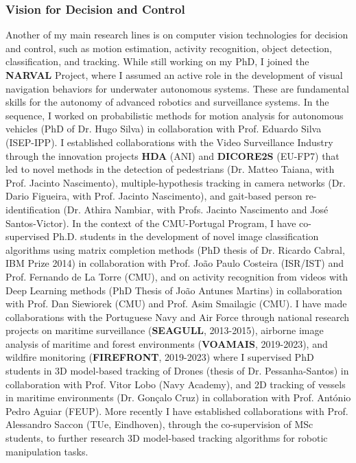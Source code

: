 \subsubsection{Vision for Decision and
Control}\label{vision-for-decision-and-control}


Another of my main research lines is on computer vision technologies for
decision and control, such as motion estimation, activity recognition,
object detection, classification, and tracking. While still working on
my PhD, I joined the \textbf{NARVAL} Project, where I assumed an active
role in the development of visual navigation behaviors for underwater
autonomous systems. These are fundamental skills for the autonomy of
advanced robotics and surveillance systems. In the sequence, I worked on
probabilistic methods for motion analysis for autonomous vehicles (PhD
of Dr. Hugo Silva) in collaboration with Prof. Eduardo Silva (ISEP-IPP).
I established collaborations with the Video Surveillance Industry
through the innovation projects \textbf{HDA} (ANI) and \textbf{DICORE2S}
(EU-FP7) that led to novel methods in the detection of pedestrians (Dr.
Matteo Taiana, with Prof. Jacinto Nascimento), multiple-hypothesis
tracking in camera networks (Dr. Dario Figueira, with Prof. Jacinto
Nascimento), and gait-based person re-identification (Dr. Athira
Nambiar, with Profs. Jacinto Nascimento and José Santos-Victor). In the
context of the CMU-Portugal Program, I have co-supervised Ph.D. students
in the development of novel image classification algorithms using matrix
completion methods (PhD thesis of Dr. Ricardo Cabral, IBM Prize 2014) in
collaboration with Prof. João Paulo Costeira (ISR/IST) and Prof.
Fernando de La Torre (CMU), and on activity recognition from videos with
Deep Learning methods (PhD Thesis of João Antunes Martins) in
collaboration with Prof. Dan Siewiorek (CMU) and Prof. Asim Smailagic
(CMU). I have made collaborations with the Portuguese Navy and Air Force
through national research projects on maritime surveillance
(\textbf{SEAGULL}, 2013-2015), airborne image analysis of maritime and
forest environments (\textbf{VOAMAIS}, 2019-2023), and wildfire
monitoring (\textbf{FIREFRONT}, 2019-2023) where I supervised PhD
students in 3D model-based tracking of Drones (thesis of Dr.
Pessanha-Santos) in collaboration with Prof. Vitor Lobo (Navy Academy),
and 2D tracking of vessels in maritime environments (Dr. Gonçalo Cruz)
in collaboration with Prof. António Pedro Aguiar (FEUP). More recently I
have established collaborations with Prof. Alessandro Saccon (TUe,
Eindhoven), through the co-supervision of MSc students, to further
research 3D model-based tracking algorithms for robotic manipulation
tasks.

